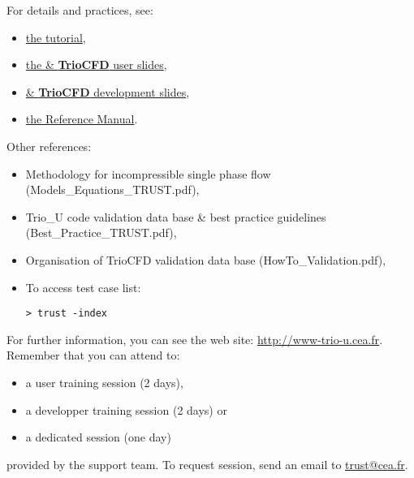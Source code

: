 For details and practices, see:
\begin{itemize}
\item \href{TRUST_tutorial.pdf}{the \trust tutorial},
\item \href{TRUST_and_TrioCFD_presentation.pdf}{the \trust \& \textbf{TrioCFD} user slides},
\item \href{Developer\_TRUST\_presentation.pdf}{\trust \& \textbf{TrioCFD} development slides},
\item \href{\REFERENCEMANUAL}{the \trustref Reference Manual}.
\end{itemize}

Other references:
\begin{itemize}
\item Methodology for incompressible single phase flow (Models\_Equations\_TRUST.pdf),
\item Trio\_U code validation data base \& best practice guidelines (Best\_Practice\_TRUST.pdf),
\item Organisation of TrioCFD validation data base (HowTo\_Validation.pdf),
\item To access \trust test case list:
\begin{verbatim}
> trust -index
\end{verbatim}
\end{itemize}
\vspace{0.5cm}

For further information, you can see the \trust web site: \href{http://www-trio-u.cea.fr}{http://www-trio-u.cea.fr}.\\

Remember that you can attend to:
\begin{itemize}
\item a user training session (2 days),
\item a developper training session (2 days) or 
\item a dedicated session (one day)
\end{itemize}
provided by the support team.
To request session, send an email to \href{mailto:trust@cea.fr}{trust@cea.fr}.

